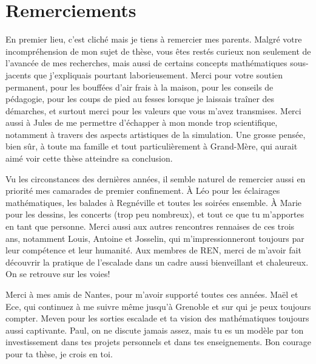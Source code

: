 \chapter*{Remerciements}


En premier lieu, c'est cliché mais je tiens à remercier mes parents. Malgré votre incompréhension de mon sujet de thèse, vous êtes restés curieux non seulement de l'avancée de mes recherches, mais aussi de certains concepts mathématiques sous-jacents que j'expliquais pourtant laborieusement. Merci pour votre soutien permanent, pour les bouffées d'air frais à la maison, pour les conseils de pédagogie, pour les coups de pied au fesses lorsque je laissais traîner des démarches, et surtout merci pour les valeurs que vous m'avez transmises. Merci aussi à Jules de me permettre d'échapper à mon monde trop scientifique, notamment à travers des aspects artistiques de la simulation. Une grosse pensée, bien sûr, à toute ma famille et tout particulièrement à Grand-Mère, qui aurait aimé voir cette thèse atteindre sa conclusion.

Vu les circonstances des dernières années, il semble naturel de remercier aussi en priorité mes camarades de premier confinement. À Léo pour les éclairages mathématiques, les balades à Regnéville et toutes les soirées ensemble. À Marie pour les dessins, les concerts (trop peu nombreux), et tout ce que tu m'apportes en tant que personne. Merci aussi aux autres rencontres rennaises de ces trois ans, notamment Louis, Antoine et Josselin, qui m'impressionneront toujours par leur compétence et leur humanité. Aux membres de REN, merci de m'avoir fait découvrir la pratique de l'escalade dans un cadre aussi bienveillant et chaleureux. On se retrouve sur les voies!

Merci à mes amis de Nantes, pour m'avoir supporté toutes ces années. Maël et Ece, qui continuez à me suivre même jusqu'à Grenoble et sur qui je peux toujours compter. Meven pour les sorties escalade et ta vision des mathématiques toujours aussi captivante. Paul, on ne discute jamais assez, mais tu es un modèle par ton investissement dans tes projets personnels et dans tes enseignements. Bon courage pour ta thèse, je crois en toi.

